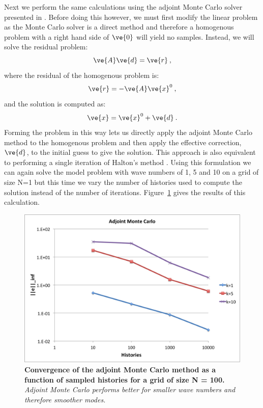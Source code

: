 \documentclass[note]{TechNote}
\begin{document}
Next we perform the same calculations using the adjoint Monte Carlo
solver presented in \cite{evans_monte_2012}. Before doing this
however, we must first modify the linear problem as the Monte Carlo
solver is a direct method and therefore a homogenous problem with a
right hand side of $\ve{0}$ will yield no samples. Instead, we will
solve the residual problem:
\begin{equation}
  \ve{A}\ve{d} = \ve{r}\:,
  \label{eq:residual_problem}
\end{equation}
where the residual of the homogenous problem is:
\begin{equation}
  \ve{r} = -\ve{A}\ve{x}^0\:,
  \label{eq:homogenous_residual}
\end{equation}
and the solution is computed as:
\begin{equation}
  \ve{x} = \ve{x}^0 + \ve{d}\:.
  \label{eq:residual_solution}
\end{equation}
Forming the problem in this way lets us directly apply the adjoint
Monte Carlo method to the homogenous problem and then apply the
effective correction, $\ve{d}$, to the initial guess to give the
solution. This approach is also equivalent to performing a single
iteration of Halton's method \cite{halton_sequential_1962}. Using this
formulation we can again solve the model problem with wave numbers of
1, 5 and 10 on a grid of size N=1 but this time we vary the number of
histories used to compute the solution instead of the number of
iterations. Figure~\ref{fig:adjoint_mc} gives the results of this
calculation.
\begin{figure}[h!]
  \begin{center}
    \includegraphics[width=5in]{adjoint_mc.png}
  \end{center}
  \caption{\textbf{Convergence of the adjoint Monte Carlo method as a
      function of sampled histories for a grid of size N = 100.}
    \textit{Adjoint Monte Carlo performs better for smaller wave
      numbers and therefore smoother modes.}}
  \label{fig:adjoint_mc}
\end{figure}
\end{document}
